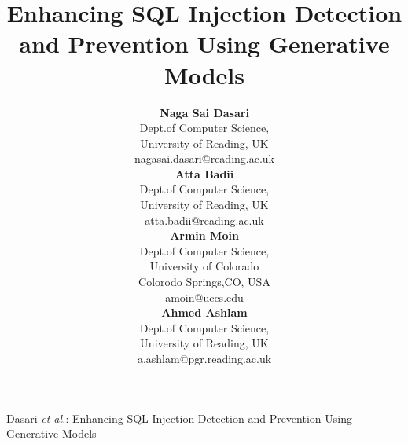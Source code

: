 \documentclass[journal]{IEEEtran}
\begin{document}
\title{Enhancing SQL Injection Detection and Prevention Using Generative Models}

\author{
\begin{minipage}[t]{0.256\textwidth}
    \centering
    \textbf{Naga Sai Dasari}\\
    Dept.of Computer Science,\\
    University of Reading, UK\\
    nagasai.dasari@reading.ac.uk
\end{minipage}%
\hfill
\begin{minipage}[t]{0.24\textwidth}
    \centering
    \textbf{ Atta Badii}\\
    Dept.of Computer Science,\\
    University of Reading, UK\\
    atta.badii@reading.ac.uk
\end{minipage}
\hfill
\begin{minipage}[t]{0.25\textwidth}
    \centering
    \textbf{Armin Moin}\\
    Dept.of Computer Science,\\
    University of Colorado\\
    Colorodo Springs,CO, USA\\
    amoin@uccs.edu
\end{minipage}
\hfill
\begin{minipage}[t]{0.24\textwidth}
    \centering
    \textbf{Ahmed Ashlam}\\
    Dept.of Computer Science,\\
    University of Reading, UK\\
    a.ashlam@pgr.reading.ac.uk
\end{minipage}
}
%
{Dasari \MakeLowercase{\textit{et al.}}: Enhancing SQL Injection Detection and Prevention Using Generative Models}

\maketitle
\end{document}
